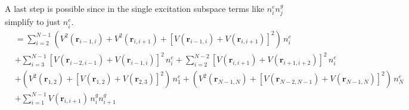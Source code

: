 A last step is possible since in the single excitation subspace terms like $n^e_in^g_j$ simplify to just $n^e_i$.
\begin{align*}
    &= \sum_{i=2}^{N-1}\left(V^2(\mathbf{r}_{i-1,i})+V^2(\mathbf{r}_{i,i+1})+\left[ V(\mathbf{r}_{i-1,i})+V(\mathbf{r}_{i,i+1}) \right]^2 \right)\,n^e_i \\&+ \sum_{i=3}^{N-1} \left[ V(\mathbf{r}_{i-2,i-1})+V(\mathbf{r}_{i-1,i}) \right]^2\, n^e_i +\sum_{i=2}^{N-2} \left[ V(\mathbf{r}_{i,i+1})+V(\mathbf{r}_{i+1,i+2}) \right]^2\,n^e_i\\
    &+ \left( V^2(\mathbf{r}_{1,2}) + \left[ V(\mathbf{r}_{1,2})+V(\mathbf{r}_{2,3}) \right]^2 \right)\,n^e_1 + \left( V^2(\mathbf{r}_{N-1,N})+ \left[ V(\mathbf{r}_{N-2,N-1})+V(\mathbf{r}_{N-1,N}) \right]^2\right)\,n^e_N\\
    &+ \sum_{i=1}^{N-1} V(\mathbf{r}_{i,i+1})\,n^g_in^g_{i+1}
\end{align*}
